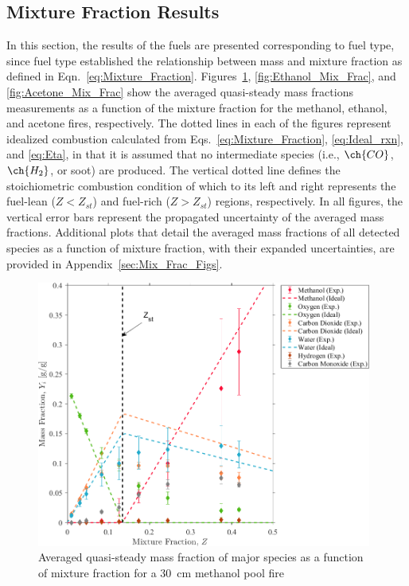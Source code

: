 \documentclass[12pt]{article}
\begin{document}
\subsection{Mixture Fraction Results}
\label{ssec:Mixture_Fraction_Results}
In this section, the results of the fuels are presented corresponding to fuel type, since fuel type established the relationship between mass and mixture fraction as defined in Eqn.~\ref{eq:Mixture_Fraction}. Figures~\ref{fig:Methanol_Mix_Frac}, \ref{fig:Ethanol_Mix_Frac}, and \ref{fig:Acetone_Mix_Frac} show the averaged quasi-steady mass fractions measurements as a function of the mixture fraction for the methanol, ethanol, and acetone fires, respectively. The dotted lines in each of the figures represent idealized combustion calculated from Eqs.~\ref{eq:Mixture_Fraction}, \ref{eq:Ideal_rxn}, and \ref{eq:Eta}, in that it is assumed that no intermediate species (i.e., $\ch{CO}$, $\ch{H_{2}}$, or soot) are produced. The vertical dotted line defines the stoichiometric combustion condition of which to its left and right represents the fuel-lean ($Z<Z_{st}$) and fuel-rich ($Z>Z_{st}$) regions, respectively. In all figures, the vertical error bars represent the propagated uncertainty of the averaged mass fractions. Additional plots that detail the averaged mass fractions of all detected species as a function of mixture fraction, with their expanded uncertainties, are provided in Appendix~\ref{sec:Mix_Frac_Figs}.

\begin{figure}[!]
	\centering
\includegraphics[width=11.0cm,keepaspectratio]{Methanol_OVERALL_Mass_Frac_Mix_Frac.png}
	\caption[Averaged quasi-steady mass fraction of major species as a function of mixture fraction for a \SI{30}{cm} methanol pool fire]{Averaged quasi-steady mass fraction of major species as a function of mixture fraction for a \SI{30}{cm} methanol pool fire}
	\label{fig:Methanol_Mix_Frac}
\end{figure}
\end{document}
